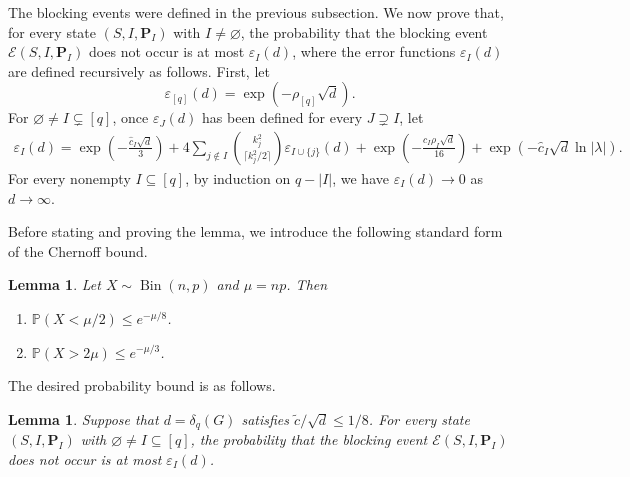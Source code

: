 \documentclass[10pt,a4paper]{amsart}
\numberwithin{equation}{section}
\newtheorem{lemma}[theorem]{Lemma}
\newcommand{\Prob}{\mathbb{P}}
\newcommand{\Bin}{\operatorname{Bin}}
\begin{document}
The blocking events were defined in the previous subsection. We now prove that,
for every state $(S,I,\mathbf{P}_I)$ with $I \ne \varnothing$, the probability
that the blocking event $\mathcal{E}(S,I,\mathbf{P}_I)$ does not occur is at most
$\varepsilon_I(d)$, where the error functions $\varepsilon_I(d)$ are defined
recursively as follows. First, let
\[
 \varepsilon_{[q]}(d) = \exp(-\rho_{[q]}\sqrt{d}).
\]
For $\varnothing \ne I \subsetneq [q]$, once $\varepsilon_J(d)$ has been
defined for every $J \supsetneq I$, let
\begin{align*}
 \varepsilon_I(d)
=  \exp\left(-\frac{\hat{c}_{I}\sqrt{d}}{3}\right)
 +4\sum_{j \notin I}
 \binom{k_j^2}{\lceil k_j^2/2\rceil}
 \varepsilon_{I \cup \{j\}}(d) 
 +\exp\left(-\frac{c_I\rho_I\sqrt{d}}{16}\right)
 +\exp\left(-\hat{c}_{I}\sqrt{d}\ln |\lambda|\right).
\end{align*}
For every nonempty $I \subseteq [q]$, by induction on $q - |I|$, we have
$\varepsilon_I(d) \to 0$ as $d \to \infty$.

Before stating and proving the lemma, we introduce the following standard form of the Chernoff bound.

\begin{lemma}\label{lem:chernoff}
	Let $X \sim \Bin(n,p)$ and $\mu=np$. Then 
	\begin{enumerate}[label=(\arabic*),ref=(\arabic*)]
		\item\label{item:chernoff-lower}
		$\Prob(X < \mu/2) \leq e^{-\mu/8}$.
		\item\label{item:chernoff-upper}
		$\Prob(X > 2\mu) \leq e^{-\mu/3}$.
	\end{enumerate}
\end{lemma}

The desired probability bound is as follows.

\begin{lemma}
\label{lem:local-blocking}
Suppose that $d = \delta_q(G)$ satisfies $\widetilde{c}/\sqrt{d} \leq 1/8$.
For every state $(S,I,\mathbf{P}_I)$ with $\varnothing \ne I \subseteq [q]$, the probability
that the blocking event $\mathcal{E}(S,I,\mathbf{P}_I)$ does not occur is at most
$\varepsilon_I(d)$.
\end{lemma}
\end{document}
